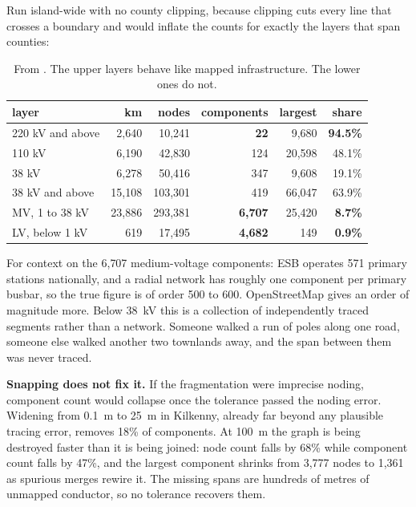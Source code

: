 \documentclass[11pt,a4paper]{article}
\begin{document}
Run island-wide with no county clipping, because clipping cuts every line that
crosses a boundary and would inflate the counts for exactly the layers that
span counties:

\begin{table}[H]\centering\small
\begin{tabular}{lrrrrr}
\toprule
\textbf{layer} & \textbf{km} & \textbf{nodes} & \textbf{components} &
\textbf{largest} & \textbf{share} \\
\midrule
220 kV and above & 2{,}640  & 10{,}241  & \textbf{22}     & 9{,}680  & \textbf{94.5\%} \\
110 kV           & 6{,}190  & 42{,}830  & 124             & 20{,}598 & 48.1\% \\
38 kV            & 6{,}278  & 50{,}416  & 347             & 9{,}608  & 19.1\% \\
38 kV and above  & 15{,}108 & 103{,}301 & 419             & 66{,}047 & 63.9\% \\
MV, 1 to 38 kV   & 23{,}886 & 293{,}381 & \textbf{6{,}707} & 25{,}420 & \textbf{8.7\%} \\
LV, below 1 kV   & 619      & 17{,}495  & \textbf{4{,}682} & 149      & \textbf{0.9\%} \\
\bottomrule
\end{tabular}
\caption{From . The upper layers behave like mapped
infrastructure. The lower ones do not.}
\end{table}

For context on the 6{,}707 medium-voltage components: ESB operates 571 primary
stations nationally, and a radial network has roughly one component per primary
busbar, so the true figure is of order 500 to 600. OpenStreetMap gives an order
of magnitude more. Below 38~kV this is a collection of independently traced
segments rather than a network. Someone walked a run of poles along one road,
someone else walked another two townlands away, and the span between them was
never traced.

\textbf{Snapping does not fix it.} If the fragmentation were imprecise noding,
component count would collapse once the tolerance passed the noding error.
Widening from 0.1~m to 25~m in Kilkenny, already far beyond any plausible
tracing error, removes 18\% of components. At 100~m the graph is being
destroyed faster than it is being joined: node count falls by 68\% while
component count falls by 47\%, and the largest component shrinks from 3{,}777
nodes to 1{,}361 as spurious merges rewire it. The missing spans are hundreds
of metres of unmapped conductor, so no tolerance recovers them.
\end{document}
